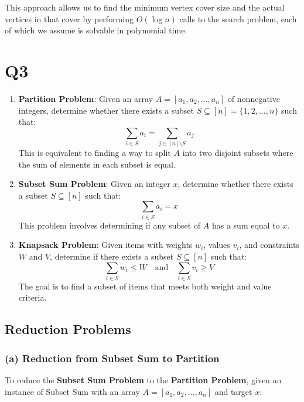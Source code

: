 \documentclass[11pt]{article}
\begin{document}
This approach allows us to find the minimum vertex cover size and the actual vertices in that cover by performing \( O(\log n) \) calls to the search problem, each of which we assume is solvable in polynomial time.

\newpage


\section*{Q3}

\begin{enumerate}
    \item \textbf{Partition Problem}: Given an array \( A = [a_1, a_2, \dots, a_n] \) of nonnegative integers, determine whether there exists a subset \( S \subseteq [n] = \{1, 2, \dots, n\} \) such that:
    \[
    \sum_{i \in S} a_i = \sum_{j \in [n] \setminus S} a_j
    \]
    This is equivalent to finding a way to split \( A \) into two disjoint subsets where the sum of elements in each subset is equal.

    \item \textbf{Subset Sum Problem}: Given an integer \( x \), determine whether there exists a subset \( S \subseteq [n] \) such that:
    \[
    \sum_{i \in S} a_i = x
    \]
    This problem involves determining if any subset of \( A \) has a sum equal to \( x \).

    \item \textbf{Knapsack Problem}: Given items with weights \( w_i \), values \( v_i \), and constraints \( W \) and \( V \), determine if there exists a subset \( S \subseteq [n] \) such that:
    \[
    \sum_{i \in S} w_i \leq W \quad \text{and} \quad \sum_{i \in S} v_i \geq V
    \]
    The goal is to find a subset of items that meets both weight and value criteria.
\end{enumerate}

\subsection*{Reduction Problems}

\subsubsection*{(a) Reduction from Subset Sum to Partition}

To reduce the \textbf{Subset Sum Problem} to the \textbf{Partition Problem}, given an instance of Subset Sum with an array \( A = [a_1, a_2, \dots, a_n] \) and target \( x \):
\end{document}
